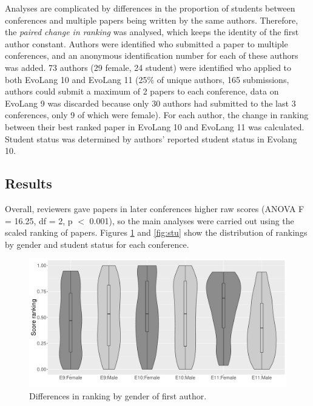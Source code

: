 \documentclass[12pt]{article}
\begin{document}
Analyses are complicated by differences in the proportion of students between conferences and multiple papers being written by the same authors.  Therefore, the \emph{paired change in ranking} was analysed, which keeps the identity of the first author constant.  Authors were identified who submitted a paper to multiple conferences, and an anonymous identification number for each of these authors was added.  73 authors (29 female, 24 student) were identified who applied to both EvoLang 10 and EvoLang 11 (25\% of unique authors, 165 submissions, authors could submit a maximum of 2 papers to each conference, data on EvoLang 9 was discarded because only 30 authors had submitted to the last 3 conferences, only 9 of which were female).  For each author, the change in ranking between their best ranked paper in EvoLang 10 and EvoLang 11 was calculated. Student status was determined by authors' reported student status in Evolang 10.

\subsection{Results}

Overall, reviewers gave papers in later conferences higher raw scores (ANOVA F = 16.25, df = 2, p $<$ 0.001), so the main analyses were carried out using the scaled ranking of papers.  Figures \ref{fig:gen} and \ref{fig:stu} show the distribution of rankings by gender and student status for each conference.  

\begin{figure}[htbp]
\begin{center}
\includegraphics[width=130mm]{../Results_Gender_3conf.pdf}

\caption{Differences in ranking by gender of first author.}
\label{fig:gen}
\end{center}
\end{figure}
\end{document}
